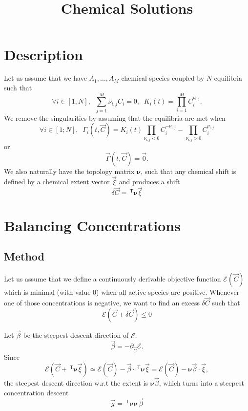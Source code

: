 \documentclass[aps]{revtex4}
\newcommand{\mymat}[1]{\bm{#1}}
\newcommand{\mytrn}[1]{~^{\mathsf{T}}{#1}}
\begin{document}
\title{Chemical Solutions}

\section{Description}
Let us assume that we have $A_1,\ldots,A_M$ chemical species coupled by
$N$ equilibria such that
\begin{equation}
	\forall i \in [1;N], \;\; \sum_{j=1}^{M} \nu_{i,j} C_i = 0, \;\; K_i(t) = \prod_{i=1}^{M} C_i^{\nu_{i,j}}.
\end{equation}
We remove the singularities by assuming that the equilibria are met when
\begin{equation}
	\forall i \in [1;N], \;\; \Gamma_i(t,\vec{C}) = K_i(t) \prod_{\nu_{i,j}<0}  C_i^{-\nu_{i,j}} -  \prod_{\nu_{i,j}>0} C_i^{\nu_{i,j}} 
\end{equation}
or
\begin{equation}
	\vec{\Gamma}(t,\vec{C}) = \vec{0}.
\end{equation}
We also naturally have the topology matrix $\mymat{\nu}$, such that
any chemical shift is defined by a  chemical extent vector $\vec{\xi}$ and
produces a shift
$$
	\delta\vec{C}=\mytrn{\mymat{\nu}}\vec{\xi}
$$

\section{Balancing Concentrations}
\subsection{Method}

Let us assume that we define a continuously derivable objective function $\mathcal{E}\left(\vec{C}\right)$ which is minimal (with value 0) when all active species are positive. Whenever one of those concentrations is negative, we want to find an excess
$\delta\vec{C}$ such that
\begin{equation}
	\mathcal{E}\left(\vec{C}+\delta\vec{C}\right) \leq 0
\end{equation}

Let $\vec{\beta}$ be the steepest descent direction of $\mathcal{E}$,
\begin{equation}
	\vec{\beta} = -\partial_{\vec{C}} \mathcal{E}.
\end{equation}
Since
\begin{equation}
	\mathcal{E}
	\left(\vec{C}+\mytrn{\mymat{\nu}}\vec{\xi}\right) 
	\simeq \mathcal{E}\left(\vec{C}\right) - \vec{\beta} \cdot \mytrn{\mymat{\nu}}\vec{\xi}
	= \mathcal{E}\left(\vec{C}\right) - \mymat{\nu}\vec{\beta}\cdot\vec{\xi},
\end{equation}
the steepest descent direction w.r.t the extent is $\mymat{\nu}\vec{\beta}$, which turns into
a steepest concentration descent 
\begin{equation}
	\vec{g} = \mytrn{\mymat{\nu}} \mymat{\nu} \, \vec{\beta}
\end{equation}
\end{document}
